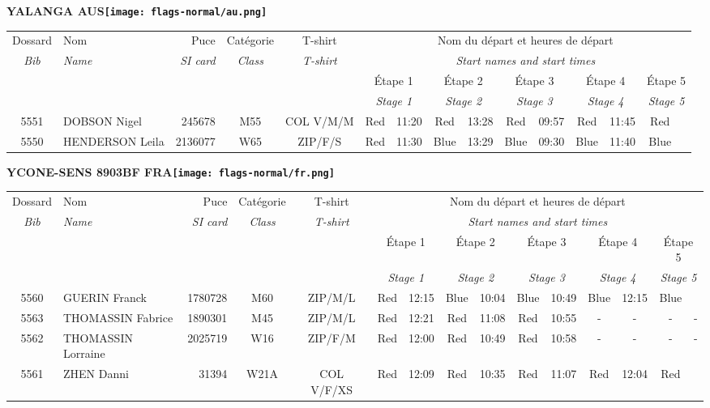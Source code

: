 \documentclass{report}
\begin{document}
\newpage
  \Huge \centering \bfseries YALANGA  AUS\normalfont \footnotesize \sffamily \hfill \texttt{[image: flags-normal/au.png]} \newline 
  \begin{longtable}{|c|l|r|c|c|*{5}{cc|}}
    Dossard & Nom  & Puce    & Catégorie & T-shirt & \multicolumn{10}{c|}{Nom du départ et heures de départ} \\
    \itshape Bib     & \itshape Name & \itshape SI card & \itshape Class  & \itshape  T-shirt  & \multicolumn{10}{c|}{\itshape Start names and start times} \\
    \hline
    & & & & & \multicolumn{2}{c|}{Étape 1} & \multicolumn{2}{c|}{Étape 2} & \multicolumn{2}{c|}{Étape 3} & \multicolumn{2}{c|}{Étape 4} & \multicolumn{2}{c|}{Étape 5} \\
    & & & & & \multicolumn{2}{c|}{\itshape Stage 1} & \multicolumn{2}{c|}{\itshape Stage 2} & \multicolumn{2}{c|}{\itshape Stage 3} & \multicolumn{2}{c|}{\itshape Stage 4} & \multicolumn{2}{c|}{\itshape Stage 5} \\
    \hline
    5551 & DOBSON Nigel & 245678 & M55 & COL V/M/M & Red & 11:20 & Red & 13:28 & Red & 09:57 & Red & 11:45 & Red &  \\
    5550 & HENDERSON Leila & 2136077 & W65 & ZIP/F/S & Red & 11:30 & Blue & 13:29 & Blue & 09:30 & Blue & 11:40 & Blue &  \\
  \end{longtable}
\newpage
  \Huge \centering \bfseries YCONE-SENS 8903BF FRA\normalfont \footnotesize \sffamily \hfill \texttt{[image: flags-normal/fr.png]} \newline 
  \begin{longtable}{|c|l|r|c|c|*{5}{cc|}}
    Dossard & Nom  & Puce    & Catégorie & T-shirt & \multicolumn{10}{c|}{Nom du départ et heures de départ} \\
    \itshape Bib     & \itshape Name & \itshape SI card & \itshape Class  & \itshape  T-shirt  & \multicolumn{10}{c|}{\itshape Start names and start times} \\
    \hline
    & & & & & \multicolumn{2}{c|}{Étape 1} & \multicolumn{2}{c|}{Étape 2} & \multicolumn{2}{c|}{Étape 3} & \multicolumn{2}{c|}{Étape 4} & \multicolumn{2}{c|}{Étape 5} \\
    & & & & & \multicolumn{2}{c|}{\itshape Stage 1} & \multicolumn{2}{c|}{\itshape Stage 2} & \multicolumn{2}{c|}{\itshape Stage 3} & \multicolumn{2}{c|}{\itshape Stage 4} & \multicolumn{2}{c|}{\itshape Stage 5} \\
    \hline
    5560 & GUERIN Franck & 1780728 & M60 & ZIP/M/L & Red & 12:15 & Blue & 10:04 & Blue & 10:49 & Blue & 12:15 & Blue &  \\
    5563 & THOMASSIN Fabrice & 1890301 & M45 & ZIP/M/L & Red & 12:21 & Red & 11:08 & Red & 10:55 & - &  - & - &  -\\
    5562 & THOMASSIN Lorraine & 2025719 & W16 & ZIP/F/M & Red & 12:00 & Red & 10:49 & Red & 10:58 & - &  - & - &  -\\
    5561 & ZHEN Danni & 31394 & W21A & COL V/F/XS & Red & 12:09 & Red & 10:35 & Red & 11:07 & Red & 12:04 & Red &  \\
  \end{longtable}
\end{document}
